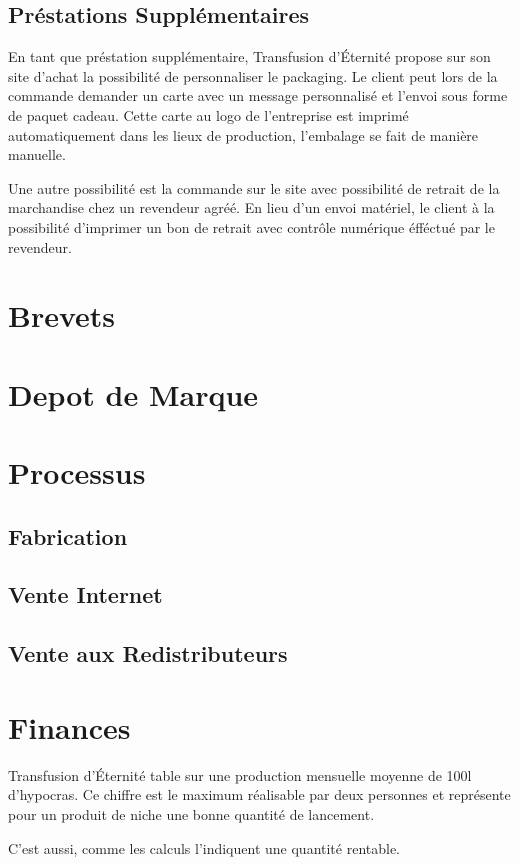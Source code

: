 \documentclass[10pt,a4paper]{article}
\newcommand{\tde}{Transfusion d'Éternité}
\begin{document}
\subsection{Préstations Supplémentaires}
En tant que préstation supplémentaire, \tde{} propose sur son site d'achat la possibilité de personnaliser le packaging.
Le client peut lors de la commande demander un carte avec un message personnalisé et l'envoi sous forme de paquet cadeau.
Cette carte au logo de l'entreprise est imprimé automatiquement dans les lieux de production, l'embalage se fait de manière manuelle.

Une autre possibilité est la commande sur le site avec possibilité de retrait de la marchandise chez un revendeur agréé.
En lieu d'un envoi matériel, le client à la possibilité d'imprimer un bon de retrait avec contrôle numérique éfféctué par le revendeur.
\section{Brevets}
\section{Depot de Marque}
\section{Processus}

\subsection{Fabrication}

\subsection{Vente Internet}
\subsection{Vente aux Redistributeurs}

\section{Finances}
\tde{} table sur une production mensuelle moyenne de 100l d'hypocras.
Ce chiffre est le maximum réalisable par deux personnes et représente pour un produit de niche une bonne quantité de lancement.

C'est aussi, comme les calculs l'indiquent une quantité rentable.
\end{document}
